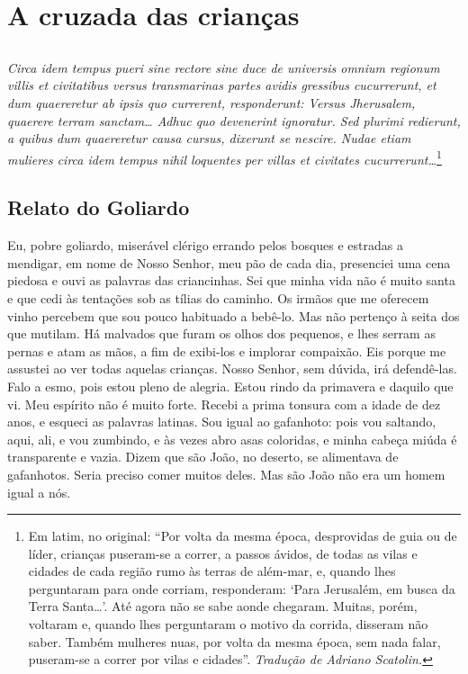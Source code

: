 \part{A cruzada das crianças}

\chapter*{}
\thispagestyle{empty}
{\itshape
Circa idem tempus pueri sine rectore sine duce de universis omnium regionum villis et civitatibus 
versus transmarinas partes avidis gressibus cucurrerunt, et dum quaereretur ab ipsis quo currerent, 
responderunt: Versus Jherusalem, quaerere terram sanctam\ldots{} Adhuc quo devenerint ignoratur. 
Sed plurimi redierunt, a quibus dum quaereretur causa cursus, dixerunt se nescire. Nudae etiam mulieres 
circa idem tempus nihil loquentes per villas et civitates cucurrerunt\ldots{}}\footnote{ Em latim, no original: ``Por volta da mesma época, 
desprovidas de guia ou de líder,  crianças puseram-se a correr, a passos ávidos, de todas as vilas e cidades de cada região rumo às terras 
de além-mar, e, quando lhes perguntaram para onde corriam, responderam: ‘Para Jerusalém, em busca da Terra Santa\ldots{}’. 
Até agora não se sabe aonde chegaram. Muitas, porém, voltaram e, quando lhes perguntaram o motivo da corrida, disseram não saber. 
Também mulheres nuas, por volta da mesma época, sem nada falar, puseram-se a correr por vilas e cidades''. \textit{Tradução de Adriano Scatolin.}}


\chapter{Relato do Goliardo}
Eu, pobre goliardo, miserável clérigo errando pelos bosques e estradas a
mendigar, em nome de Nosso Senhor, meu pão de cada dia, presenciei uma
cena piedosa e ouvi as palavras das criancinhas. Sei que minha vida não é
muito santa e que cedi às tentações sob as tílias do caminho. Os irmãos
que me oferecem vinho percebem que sou pouco habituado a bebê-lo. Mas não
pertenço à seita dos que mutilam. Há malvados que furam os olhos dos
pequenos, e lhes serram as pernas e atam as mãos, a fim de exibi-los e
implorar compaixão. Eis porque me assustei ao ver todas aquelas crianças.
Nosso Senhor, sem dúvida, irá defendê-las. Falo a esmo, pois estou pleno
de alegria. Estou rindo da primavera e daquilo que vi. Meu espírito não é
muito forte. Recebi a prima tonsura com a idade de dez anos, e esqueci as
palavras latinas. Sou igual ao gafanhoto: pois vou saltando, aqui, ali, e
vou zumbindo, e às vezes abro asas coloridas, e minha cabeça miúda é
transparente e vazia. Dizem que são João, no deserto, se alimentava de
gafanhotos. Seria preciso comer muitos deles. Mas são João não era um
homem igual a nós.

